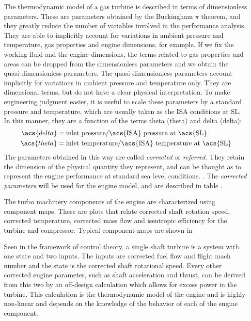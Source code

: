 \documentclass[tcc]{subfiles}
\begin{document}
The thermodynamic model of a gas turbine is described in terms of dimensionless parameters.%
These are parameters obtained by the Buckingham $\pi$ theorem, 
 and they greatly reduce the number of variables involved in the performance analysis.
 They are able to implicitly account for variations in ambient pressure and temperature, 
 gas properties and engine dimensions, for example.
If we fix the working fluid and the engine dimensions, the terms related to gas properties and areas can be dropped from the dimensionless parameters and we obtain the quasi-dimensionless parameters.
The quasi-dimensionless parameters account implicitly for variations in ambient pressure and temperature only.
They are dimensional terms, but do not have a clear physical interpretation. 
To make engineering judgment easier, it is useful to scale these parameters by 
 a standard pressure and temperature, which are usually taken as the 
 \gls{ISA} conditions at \gls{SL}. 
In this manner, they are a function of the terms theta (\acs{theta}) and delta (\acs{delta}):
\begin{align}
    \acs{delta} &= \text{inlet pressure}/\text{\acs{ISA} pressure at \acs{SL}} \\
    \acs{theta} &= \text{inlet temperature}/\text{\acs{ISA} temperature at \acs{SL}}
\end{align}
The parameters obtained in this way are called \emph{corrected} or \emph{referred}.
They retain the dimension of the physical quantity they represent, 
 and can be thought as to represent the engine performance at standard sea level conditions.
\cite{walsh2004gas}. 
The \emph{corrected parameters} will be used for the engine model,
 and are described in table .
 
The turbo machinery components of the engine are characterized using component maps.%
 These are plots that relate corrected shaft rotation speed, corrected temperature,
 corrected mass flow and isentropic efficiency for the turbine and compressor.
Typical component maps are shown in 

Seen in the framework of control theory,
 a single shaft turbine is a system with one state and two inputs.
 The inputs are corrected fuel flow and flight mach number 
 and the state is the corrected shaft rotational speed.
 Every other corrected engine parameter, such as shaft acceleration and thrust,
 can be derived from this two by an off-design calculation
 which allows for excess power in the turbine.
This calculation is the thermodynamic model of the engine and is highly non-linear and depends on the knowledge of the behavior of each of the engine component.
\end{document}
